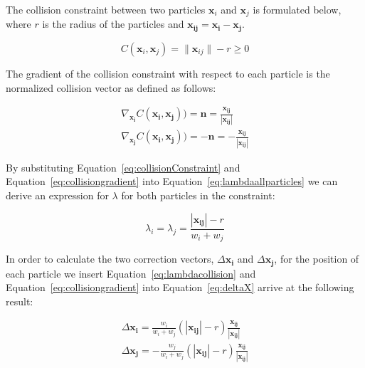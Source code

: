 The collision constraint between two particles $ \mathbf{x}_{i} $ and $
\mathbf{x}_{j} $ is formulated below, where
$ r $ is the radius of the particles and $ \mathbf{x_{ij}} = \mathbf{x_{i}} - \mathbf{x_{j}} $.

\begin{equation} \label{eq:collisionConstraint}
  C(\mathbf{x}_{i}, \mathbf{x}_{j}) = \| \mathbf{x}_{ij} \| - r \geq 0
\end{equation}

The gradient of the collision constraint with respect to each particle is the
normalized collision vector as defined as follows:

\begin{equation}
\label{eq:collisiongradient}
\begin{aligned}
\nabla_{\mathbf{x_{i}}} C(\mathbf{x_{i}}, \mathbf{x_{j}})) = \mathbf{n} = \frac{\mathbf{x_{ij}}}{\left | \mathbf{x_{ij}} \right |}
\\
\nabla_{\mathbf{x_{j}}} C(\mathbf{x_{i}}, \mathbf{x_{j}})) = - \mathbf{n} = - \frac{\mathbf{x_{ij}}}{\left | \mathbf{x_{ij}} \right |}
\end{aligned}
\end{equation}

By substituting Equation~\ref{eq:collisionConstraint} and
Equation~\ref{eq:collisiongradient} into Equation~\ref{eq:lambdaallparticles}
we can derive an expression for $ \lambda $ for both particles in the
constraint:

\begin{equation}
\label{eq:lambdacollision}
\lambda_{i} = \lambda_{j} = \frac{\left | \mathbf{x_{ij}} \right | - r}{w_{i} + w_{j}}
\end{equation}

In order to calculate the two correction vectors, $ \Delta \mathbf{x_{i}} $ and
$ \Delta \mathbf{x_{j}} $, for the position of each particle we insert
Equation~\ref{eq:lambdacollision} and Equation~\ref{eq:collisiongradient} into
Equation~\ref{eq:deltaX} arrive at the following result:

\begin{equation}
\label{eq:collisionresult}
\begin{aligned}
\Delta \mathbf{x_{i}} = \frac{w_{i}}{w_{i} + w_{j}}(\left | \mathbf{x_{ij}} \right | - r) \frac{\mathbf{x_{ij}}}{\left | \mathbf{x_{ij}} \right |}
\\
\Delta \mathbf{x_{j}} = -\frac{w_{j}}{w_{i} + w_{j}}(\left | \mathbf{x_{ij}} \right | - r) \frac{\mathbf{x_{ij}}}{\left | \mathbf{x_{ij}} \right |}
\end{aligned}
\end{equation}

